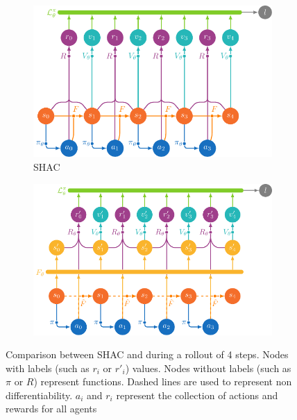 \begin{figure}[t]
    \centering
    \begin{subfigure}[b]{0.45\textwidth}
        \includegraphics[width=\textwidth]{figs/shac.pdf}
        \caption{SHAC}%
        \label{fig:shac}
    \end{subfigure}
    \begin{subfigure}[b]{0.45\textwidth}
        \includegraphics[width=\textwidth]{figs/shacpp.pdf}
        \caption{\fname{}}%
        \label{fig:shacpp}
    \end{subfigure}
    \caption{
        Comparison between SHAC and \fname{} during a rollout of 4 steps.
        Nodes with labels (such as $r_i$ or $r'_i$) values. Nodes without labels (such as $\pi$ or $R$) represent functions. Dashed lines are used to represent non differentiability. $a_i$ and $r_i$ represent the collection of actions and rewards for all agents}\label{fig:shac-shacpp}
\end{figure}


